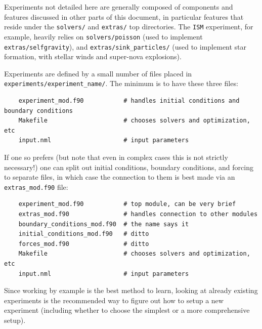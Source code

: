 \documentclass[paper=a4,fontsize=11pt]{scrartcl}
\numberwithin{equation}{section}		%
\numberwithin{figure}{section}			%
\numberwithin{table}{section}				%
\newcommand{\codecolor}{\color{Blue}}
\newcommand{\filecolor}{\color{NavyBlue}}
\newcommand{\File}[1]{{\filecolor\texttt{#1}}}
\begin{document}
Experiments not detailed here are generally composed of components and features discussed in other parts of this document, in particular features that reside under the \verb|solvers/| and \verb|extras/| top directories.  The \verb|ISM| experiment, for example, heavily relies on \verb|solvers/poisson| (used to implement \verb|extras/selfgravity|), and \verb|extras/sink_particles/| (used to implement star formation, with stellar winds and super-nova explosions).

Experiments are defined by a small number of files placed in \File{experiments/experiment\_name/}.  The minimum is to have these three files:
{\codecolor\small\begin{verbatim}
    experiment_mod.f90           # handles initial conditions and boundary conditions
    Makefile                     # chooses solvers and optimization, etc
    input.nml                    # input parameters
\end{verbatim}}
If one so prefers (but note that even in complex cases this is not strictly necessary!) one can split out initial conditions, boundary conditions, and forcing to separate files, in which case the connection to them is best made via an \File{extras\_mod.f90} file:
{\codecolor\small\begin{verbatim}
    experiment_mod.f90           # top module, can be very brief
    extras_mod.f90               # handles connection to other modules
    boundary_conditions_mod.f90  # the name says it
    initial_conditions_mod.f90   # ditto
    forces_mod.f90               # ditto
    Makefile                     # chooses solvers and optimization, etc
    input.nml                    # input parameters
\end{verbatim}}
Since working by example is the best method to learn, looking at already existing experiments is the recommended way to figure out how to setup a new experiment (including whether to choose the simplest or a more comprehensive setup).

\end{document}
